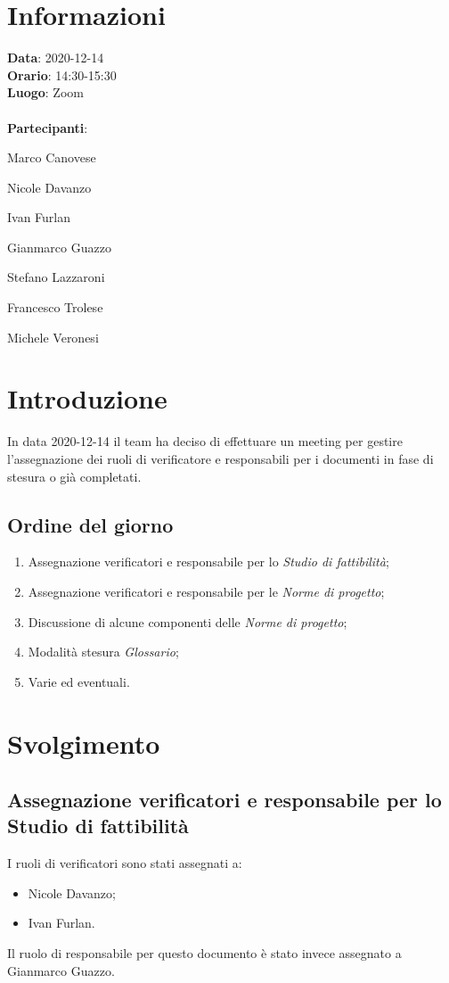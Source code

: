 \section{Informazioni}
\textbf{Data}: 2020-12-14\\
\textbf{Orario}: 14:30-15:30\\
\textbf{Luogo}: Zoom\\\\
\textbf{Partecipanti}:\begin{list}{*}{\setlength{\itemsep}{0cm}}
	\item Marco Canovese
	\item Nicole Davanzo
	\item Ivan Furlan
	\item Gianmarco Guazzo
	\item Stefano Lazzaroni
	\item Francesco Trolese
	\item Michele Veronesi
\end{list}

\section{Introduzione}
In data 2020-12-14 il team ha deciso di effettuare un meeting per gestire l'assegnazione dei ruoli di verificatore e responsabili per i documenti in fase di stesura o già completati.

\subsection{Ordine del giorno}
\begin{enumerate}
    \item Assegnazione verificatori e responsabile per lo \textit{Studio di fattibilità};
    \item Assegnazione verificatori e responsabile per le \textit{Norme di progetto};
    \item Discussione di alcune componenti delle \textit{Norme di progetto};
    \item Modalità stesura \textit{Glossario};
    \item Varie ed eventuali.
\end{enumerate}

\section{Svolgimento}
	\subsection{Assegnazione verificatori e responsabile per lo Studio di fattibilità}
	I ruoli di verificatori sono stati assegnati a:
	\begin{itemize}
		\item Nicole Davanzo;
		\item Ivan Furlan.
	\end{itemize}
	Il ruolo di responsabile per questo documento è stato invece assegnato a Gianmarco Guazzo.

